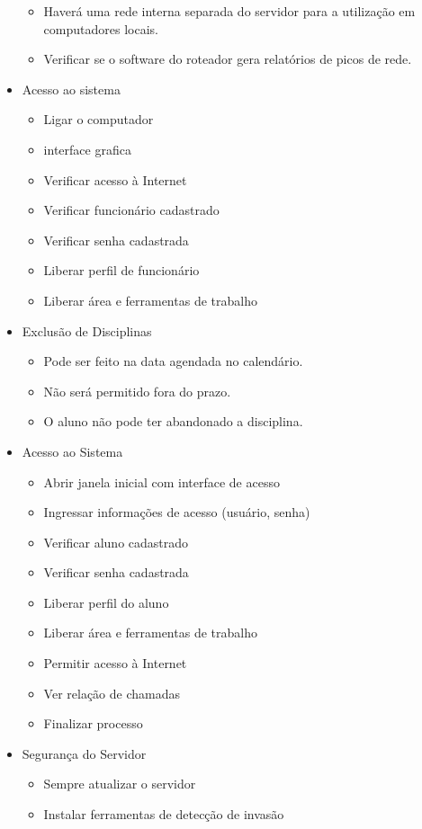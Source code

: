 \begin{itemize}
\begin{itemize}
	\item Haverá uma rede interna separada do servidor para a utilização em computadores locais.
	\item Verificar se o software do roteador gera relatórios de picos de rede.
	\end{itemize}
\item Acesso ao sistema
	\begin{itemize}
	\item Ligar o computador
	\item interface grafica
	\item Verificar acesso à Internet
	\item Verificar funcionário cadastrado 
	\item Verificar senha cadastrada 
	\item Liberar perfil de funcionário 
	\item Liberar área e ferramentas de trabalho
	\end{itemize}
\item Exclusão de Disciplinas
	\begin{itemize}
	\item Pode ser feito na data agendada no calendário.
	\item Não será permitido fora do prazo.
	\item O aluno não pode ter abandonado a disciplina.
	\end{itemize}
\item Acesso ao Sistema
	\begin{itemize}
	\item Abrir janela inicial com interface de acesso 
	\item Ingressar informações de acesso (usuário, senha) 
	\item Verificar aluno cadastrado 
	\item Verificar senha cadastrada 
	\item Liberar perfil do aluno 
	\item Liberar área e ferramentas de trabalho 
	\item Permitir acesso à Internet 
	\item Ver relação de chamadas
	\item Finalizar processo
	\end{itemize}
\item Segurança do Servidor
	\begin{itemize}
	\item Sempre atualizar o servidor
	\item Instalar ferramentas de detecção de invasão

\end{itemize}
\end{itemize}
